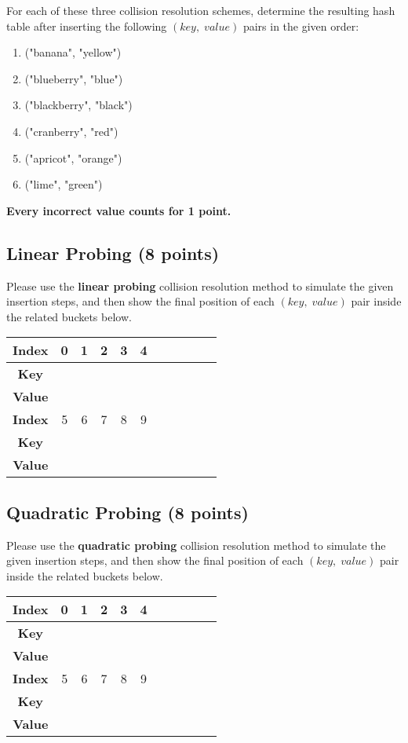 \documentclass[11pt]{exam}
\begin{document}
For each of these three collision resolution schemes, determine the resulting hash table after inserting the following $(key,\;value)$ pairs in the given order:
\begin{enumerate}[1.]
\item ("banana", "yellow")
\item ("blueberry", "blue")
\item ("blackberry", "black")
\item ("cranberry", "red")
\item ("apricot", "orange")
\item ("lime", "green")
\end{enumerate}

\textbf{Every incorrect value counts for 1 point.}
\subsection{Linear Probing (8 points)}
Please use the \textbf{linear probing} collision resolution method to simulate the given insertion steps, and then show the final position of each $(key,\;value)$ pair inside the related buckets below.
\begin{solution}
\begin{table}[H]
\centering
\renewcommand{\arraystretch}{2}
\setlength{\tabcolsep}{11mm}
\begin{tabular}{|c|c|c|c|c|c|c|c|c|c|c|}
\hline
\textbf{Index}&0&1&2&3&4\\
\hline
\textbf{Key}&&&&&\\
\hline
\textbf{Value}&&&&&\\
\hline
\textbf{Index}&5&6&7&8&9\\
\hline
\textbf{Key}&&&&&\\
\hline
\textbf{Value}&&&&&\\
\hline
\end{tabular}
\end{table}
\end{solution}

\subsection{Quadratic Probing (8 points)}
Please use the \textbf{quadratic probing} collision resolution method to simulate the given insertion steps, and then show the final position of each $(key,\;value)$ pair inside the related buckets below.
\begin{solution}
\begin{table}[H]
\centering
\renewcommand{\arraystretch}{2}
\setlength{\tabcolsep}{11mm}
\begin{tabular}{|c|c|c|c|c|c|c|c|c|c|c|}
\hline
\textbf{Index}&0&1&2&3&4\\
\hline
\textbf{Key}&&&&&\\
\hline
\textbf{Value}&&&&&\\
\hline
\textbf{Index}&5&6&7&8&9\\
\hline
\textbf{Key}&&&&&\\
\hline
\textbf{Value}&&&&&\\
\hline
\end{tabular}
\end{table}
\end{solution}
\end{document}
